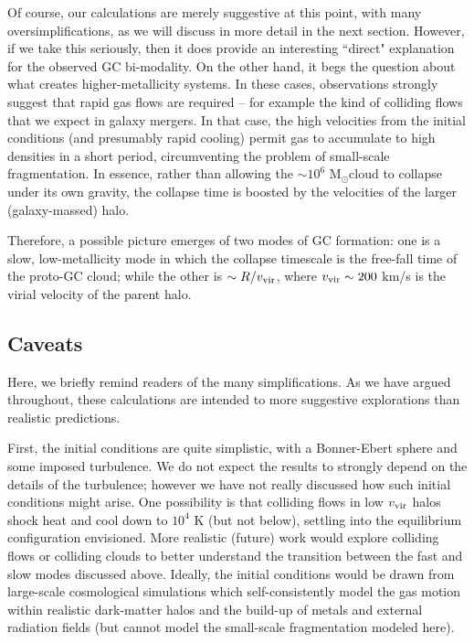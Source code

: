 \documentclass[useAMS,usenatbib]{mn2e}
\newcommand{\msun}{{M$_\odot$}}
\begin{document}
Of course, our calculations are merely suggestive at this point, with many oversimplifications, as we will discuss in more detail in the next section.  However, if we take this seriously, then it does provide an interesting ``direct" explanation for the observed GC bi-modality.  On the other hand, it begs the question about what creates higher-metallicity systems.  In these cases, observations strongly suggest that rapid gas flows are required -- for example the kind of colliding flows that we expect in galaxy mergers.  In that case, the high velocities from the initial conditions (and presumably rapid cooling) permit gas to accumulate to high densities in a short period, circumventing the problem of small-scale fragmentation.  In essence, rather than allowing the $\sim 10^6$ \msun cloud to collapse under its own gravity, the collapse time is boosted by the velocities of the larger (galaxy-massed) halo.  

Therefore, a possible picture emerges of two modes of GC formation: one is a slow, low-metallicity mode in which the collapse timescale is the free-fall time of the proto-GC cloud; while the other is $\sim R/v_{\rm vir}$, where $v_{\rm vir} \sim 200$ km/s is the virial velocity of the parent halo.

\subsection{Caveats}

Here, we briefly remind readers of the many simplifications.  As we have argued throughout, these calculations are intended to more suggestive explorations than realistic predictions.  

First, the initial conditions are quite simplistic, with a Bonner-Ebert sphere and some imposed turbulence.  We do not expect the results to strongly depend on the details of the turbulence; however we have not really discussed how such initial conditions might arise.  One possibility is that colliding flows in low $v_{\rm vir}$ halos shock heat and cool down to $10^4$ K (but not below), settling into the equilibrium configuration envisioned.  More realistic (future) work would explore colliding flows or colliding clouds to better understand the transition between the fast and slow modes discussed above.  Ideally, the initial conditions would be drawn from large-scale cosmological simulations which self-consistently model the gas motion within realistic dark-matter halos and the build-up of metals and external radiation fields (but cannot model the small-scale fragmentation modeled here).
\end{document}
